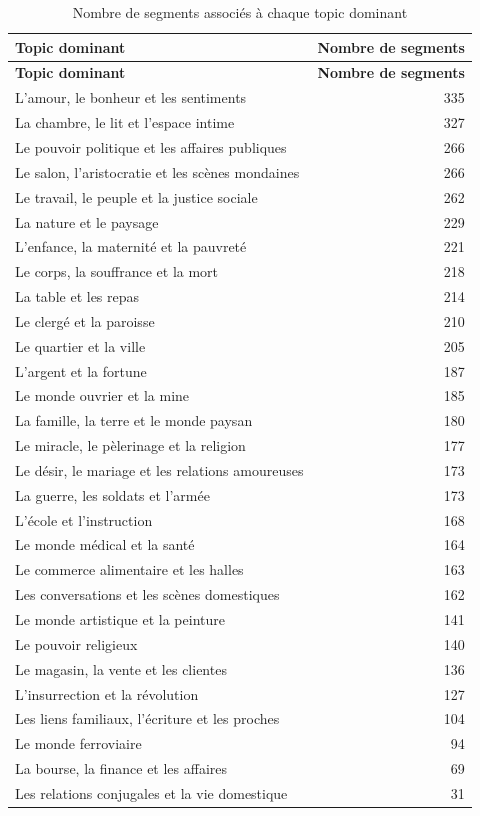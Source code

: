 \begin{longtable}{p{10cm}r}
\caption{Nombre de segments associés à chaque topic dominant} \\
\toprule
\textbf{Topic dominant} & \textbf{Nombre de segments} \\
\midrule
\endfirsthead

\toprule
\textbf{Topic dominant} & \textbf{Nombre de segments} \\
\midrule
\endhead
L'amour, le bonheur et les sentiments & 335 \\
La chambre, le lit et l'espace intime & 327 \\
Le pouvoir politique et les affaires publiques & 266 \\
Le salon, l'aristocratie et les scènes mondaines & 266 \\
Le travail, le peuple et la justice sociale & 262 \\
La nature et le paysage & 229 \\
L'enfance, la maternité et la pauvreté & 221 \\
Le corps, la souffrance et la mort & 218 \\
La table et les repas & 214 \\
Le clergé et la paroisse & 210 \\
Le quartier et la ville & 205 \\
L'argent et la fortune & 187 \\
Le monde ouvrier et la mine & 185 \\
La famille, la terre et le monde paysan & 180 \\
Le miracle, le pèlerinage et la religion & 177 \\
Le désir, le mariage et les relations amoureuses & 173 \\
La guerre, les soldats et l'armée & 173 \\
L'école et l'instruction & 168 \\
Le monde médical et la santé & 164 \\
Le commerce alimentaire et les halles & 163 \\
Les conversations et les scènes domestiques & 162 \\
Le monde artistique et la peinture & 141 \\
Le pouvoir religieux & 140 \\
Le magasin, la vente et les clientes & 136 \\
L'insurrection et la révolution & 127 \\
Les liens familiaux, l'écriture et les proches & 104 \\
Le monde ferroviaire & 94 \\
La bourse, la finance et les affaires & 69 \\
Les relations conjugales et la vie domestique & 31 \\
\bottomrule
\end{longtable}

